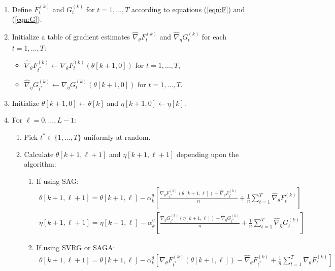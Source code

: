 \begin{enumerate}
    \item Define $F_t^{(k)}$ and $G_t^{(k)}$ for $t = 1, \ldots, T$ according to equations (\ref{eqn:F}) and (\ref{eqn:G}).
    \item Initialize a table of gradient estimates $\widehat \nabla_\theta F_t^{(k)}$ and $\widehat \nabla_\eta G_t^{(k)}$ for each $t = 1,\ldots,T$:
    \begin{itemize}
        \item $\widehat \nabla_\theta F_{t^*}^{(k)} \leftarrow \nabla_\theta F_{t}^{(k)}(\theta[k+1,0])$ for $t = 1,\ldots,T$,
        \item $\widehat \nabla_\eta G_{t^*}^{(k)} \leftarrow \nabla_\eta G_{t}^{(k)}(\theta[k+1,0])$ for $t = 1,\ldots,T$.
    \end{itemize}
    \item Initialize $\theta[k+1,0] \leftarrow \theta[k]$ and $\eta[k+1,0] \leftarrow \eta[k]$.
    \item For $\ell = 0,\ldots,L-1$:
    \begin{enumerate}
        \item Pick $t^* \in \{1,\ldots,T\}$ uniformly at random.
        \item Calculate $\theta[k+1,\ell+1]$ and $\eta[k+1,\ell+1]$ depending upon the algorithm:
        \begin{enumerate}
            \item If using SAG:
            \begin{gather}
                \theta[k+1,\ell+1] = \theta[k+1,\ell] - \alpha^{\theta}_k \left[\frac{\nabla_\theta F_{t^*}^{(k)}(\theta[k+1,\ell]) - \widehat \nabla_\theta F_{t^*}^{(k)}}{n} + \frac{1}{n} \sum_{t=1}^T \widehat \nabla_\theta F^{(k)}_{t} \right] \\
                \eta[k+1,\ell+1] = \eta[k+1,\ell] - \alpha^{\eta}_k \left[\frac{\nabla_\eta G_{t^*}^{(k)}(\eta[k+1,\ell]) - \widehat \nabla_\eta G_{t^*}^{(k)}}{n} + \frac{1}{n} \sum_{t=1}^T \widehat \nabla_\eta G^{(k)}_{t} \right]
            \end{gather}
            \item If using SVRG or SAGA:
            \begin{gather}
                \theta[k+1,\ell+1] = \theta[k+1,\ell] - \alpha^{\theta}_k \left[\nabla_\theta F_{t^*}^{(k)}(\theta[k+1,\ell]) - \widehat \nabla_\theta F_{t^*}^{(k)} + \frac{1}{n} \sum_{t=1}^T \widehat \nabla_\theta F^{(k)}_{t} \right] \\

\end{gather}
\end{enumerate}
\end{enumerate}
\end{enumerate}

